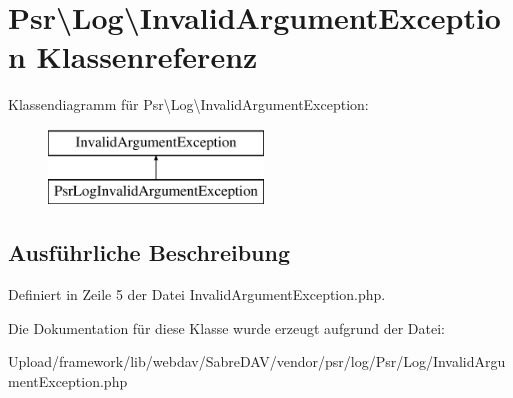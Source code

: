 \hypertarget{class_psr_1_1_log_1_1_invalid_argument_exception}{}\section{Psr\textbackslash{}Log\textbackslash{}Invalid\+Argument\+Exception Klassenreferenz}
\label{class_psr_1_1_log_1_1_invalid_argument_exception}
Klassendiagramm für Psr\textbackslash{}Log\textbackslash{}Invalid\+Argument\+Exception\+:\begin{figure}[H]
\begin{center}
\leavevmode
\includegraphics[height=2.000000cm]{class_psr_1_1_log_1_1_invalid_argument_exception}
\end{center}
\end{figure}


\subsection{Ausführliche Beschreibung}


Definiert in Zeile 5 der Datei Invalid\+Argument\+Exception.\+php.



Die Dokumentation für diese Klasse wurde erzeugt aufgrund der Datei\+:\begin{DoxyCompactItemize}
\item 
Upload/framework/lib/webdav/\+Sabre\+D\+A\+V/vendor/psr/log/\+Psr/\+Log/Invalid\+Argument\+Exception.\+php\end{DoxyCompactItemize}
